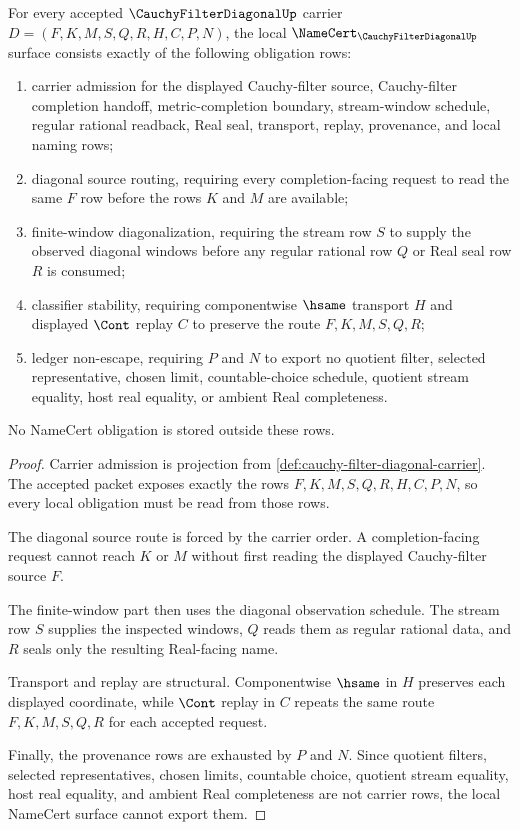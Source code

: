\begin{theorem}
\label{thm:cauchy-filter-diagonal-namecert-obligations}
For every accepted $\CauchyFilterDiagonalUp$ carrier $D=(F,K,M,S,Q,R,H,C,P,N)$, the local $\NameCert_{\CauchyFilterDiagonalUp}$ surface consists exactly of the following obligation rows:
\begin{enumerate}
\item carrier admission for the displayed Cauchy-filter source, Cauchy-filter completion handoff, metric-completion boundary, stream-window schedule, regular rational readback, Real seal, transport, replay, provenance, and local naming rows;
\item diagonal source routing, requiring every completion-facing request to read the same $F$ row before the rows $K$ and $M$ are available;
\item finite-window diagonalization, requiring the stream row $S$ to supply the observed diagonal windows before any regular rational row $Q$ or Real seal row $R$ is consumed;
\item classifier stability, requiring componentwise $\hsame$ transport $H$ and displayed $\Cont$ replay $C$ to preserve the route $F,K,M,S,Q,R$;
\item ledger non-escape, requiring $P$ and $N$ to export no quotient filter, selected representative, chosen limit, countable-choice schedule, quotient stream equality, host real equality, or ambient Real completeness.
\end{enumerate}
No NameCert obligation is stored outside these rows.
\end{theorem}
\begin{proof}
Carrier admission is projection from \autoref{def:cauchy-filter-diagonal-carrier}. The accepted packet exposes exactly the rows $F,K,M,S,Q,R,H,C,P,N$, so every local obligation must be read from those rows.

The diagonal source route is forced by the carrier order. A completion-facing request cannot reach $K$ or $M$ without first reading the displayed Cauchy-filter source $F$.

The finite-window part then uses the diagonal observation schedule. The stream row $S$ supplies the inspected windows, $Q$ reads them as regular rational data, and $R$ seals only the resulting Real-facing name.

Transport and replay are structural. Componentwise $\hsame$ in $H$ preserves each displayed coordinate, while $\Cont$ replay in $C$ repeats the same route $F,K,M,S,Q,R$ for each accepted request.

Finally, the provenance rows are exhausted by $P$ and $N$. Since quotient filters, selected representatives, chosen limits, countable choice, quotient stream equality, host real equality, and ambient Real completeness are not carrier rows, the local NameCert surface cannot export them.
\end{proof}

